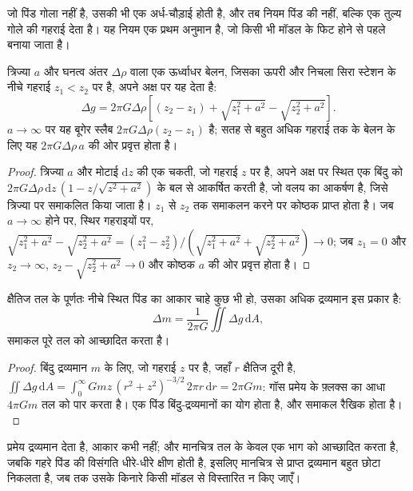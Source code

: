 जो पिंड गोला नहीं है, उसकी भी एक अर्ध-चौड़ाई होती है, और तब नियम
पिंड की नहीं, बल्कि एक तुल्य गोले की गहराई देता है। यह नियम
एक प्रथम अनुमान है, जो किसी भी मॉडल के फिट होने से पहले बनाया जाता है।

\begin{proposition}[अपने अक्ष पर ऊर्ध्वाधर बेलन]\label{prop:b3:field-lab-methods-3:vcyl}
त्रिज्या $a$ और घनत्व अंतर $\Delta\rho$ वाला एक ऊर्ध्वाधर बेलन, जिसका
ऊपरी और निचला सिरा स्टेशन के नीचे गहराई $z_1 < z_2$ पर है,
अपने अक्ष पर यह देता है:
\[
\Delta g = 2\pi G\Delta\rho\left[(z_2 - z_1) + \sqrt{z_1^2 + a^2}
           - \sqrt{z_2^2 + a^2}\right] .
\]
$a \to \infty$ पर यह बूगेर स्लैब $2\pi G\Delta\rho(z_2 - z_1)$ है;
सतह से बहुत अधिक गहराई तक के बेलन के लिए यह
$2\pi G\Delta\rho\,a$ की ओर प्रवृत्त होता है।
\end{proposition}

\begin{proof}
त्रिज्या $a$ और मोटाई $\mathrm{d}z$ की एक चकती, जो गहराई $z$ पर है, अपने अक्ष पर स्थित
एक बिंदु को $2\pi G\Delta\rho\,\mathrm{d}z\,(1 -
z/\sqrt{z^2 + a^2})$ के बल से आकर्षित करती है, जो वलय का आकर्षण है, जिसे
त्रिज्या पर समाकलित किया जाता है। $z_1$ से $z_2$ तक समाकलन करने पर कोष्ठक प्राप्त होता है। जब $a \to
\infty$ होने पर, स्थिर गहराइयों पर, $\sqrt{z_1^2 + a^2} - \sqrt{z_2^2 + a^2} =
(z_1^2 - z_2^2)/(\sqrt{z_1^2 + a^2} + \sqrt{z_2^2 + a^2}) \to 0$; जब
$z_1 = 0$ और $z_2 \to \infty$, $z_2 - \sqrt{z_2^2 + a^2} \to 0$ और
कोष्ठक $a$ की ओर प्रवृत्त होता है।
\end{proof}

\begin{proposition}[गुरुत्व मानचित्र से अधिक द्रव्यमान]\label{prop:b3:field-lab-methods-3:gauss}
क्षैतिज तल के पूर्णतः नीचे स्थित पिंड का आकार चाहे कुछ भी हो,
उसका अधिक द्रव्यमान इस प्रकार है:
\[
\Delta m = \frac{1}{2\pi G}\iint \Delta g\,\mathrm{d}A ,
\]
समाकल पूरे तल को आच्छादित करता है।
\end{proposition}

\begin{proof}
बिंदु द्रव्यमान $m$ के लिए, जो गहराई $z$ पर है, जहाँ $r$ क्षैतिज दूरी है,
$\iint \Delta g\,\mathrm{d}A = \int_0^\infty
Gmz\,(r^2 + z^2)^{-3/2}\,2\pi r\,\mathrm{d}r = 2\pi Gm$: गॉस प्रमेय के फ़्लक्स का आधा
$4\pi Gm$ तल को पार करता है। एक पिंड बिंदु-द्रव्यमानों का योग होता है,
और समाकल रैखिक होता है।
\end{proof}

प्रमेय द्रव्यमान देता है, आकार कभी नहीं; और मानचित्र तल के केवल एक भाग को
आच्छादित करता है, जबकि गहरे पिंड की विसंगति धीरे-धीरे क्षीण होती है, इसलिए
मानचित्र से प्राप्त द्रव्यमान बहुत छोटा निकलता है, जब तक उसके किनारे
किसी मॉडल से विस्तारित न किए जाएँ।

